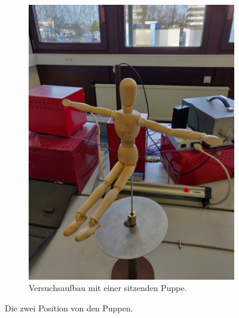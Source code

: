 \begin{figure}
\begin{subfigure}{0.5\textwidth}
    \includegraphics[scale=0.1]{content/data/PuppeSitzend.png}
    \caption{Versuchsaufbau mit einer sitzenden Puppe.}
    \label{fig:puppesitzend}
\end{subfigure}
\caption{Die zwei Position von den Puppen.}
\label{fig:puppen}
\end{figure}
\FloatBarrier

